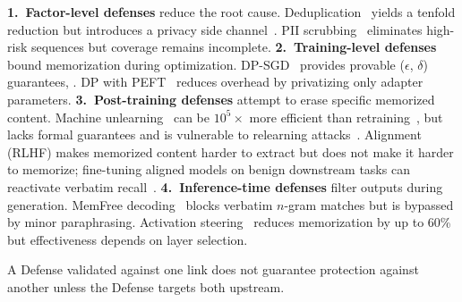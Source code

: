 \documentclass[11pt]{article}
\begin{document}
\textbf{1.~Factor-level defenses} reduce the root cause.
Deduplication~\citep{lee2022deduplicating} yields a tenfold reduction but
introduces a privacy side channel~\citep{debenedetti2024privacy}.
PII scrubbing~\citep{lukas2023analyzing} eliminates high-risk sequences but
coverage remains incomplete.
\textbf{2.~Training-level defenses} bound memorization during optimization.
DP-SGD~\citep{abadi2016deep} provides provable ($\epsilon$, $\delta$)
guarantees, .
DP with PEFT~\citep{ma2024efficient, liu2024differentially} reduces overhead
by privatizing only adapter parameters.
\textbf{3.~Post-training defenses} attempt to erase specific memorized
content.
Machine unlearning~\citep{cooper2024machine} can be $10^5\times$ more
efficient than retraining~\citep{yao2024machine}, but lacks formal guarantees
and is vulnerable to relearning attacks~\citep{dong2025practical}.
Alignment (RLHF) makes memorized content harder to extract but does not make
it harder to memorize; fine-tuning aligned models on benign downstream tasks
can reactivate verbatim recall~\citep{liu2026alignmentwhackamolefinetuning}.
\textbf{4.~Inference-time defenses} filter outputs during generation.
MemFree decoding~\citep{ippolito-etal-2023-preventing} blocks verbatim
$n$-gram matches but is bypassed by minor paraphrasing.
Activation steering~\citep{suri2025mitigating} reduces memorization by up to
60\% but effectiveness depends on layer selection.

A Defense validated against one link does not guarantee protection against
another unless the Defense targets both upstream.
\end{document}
